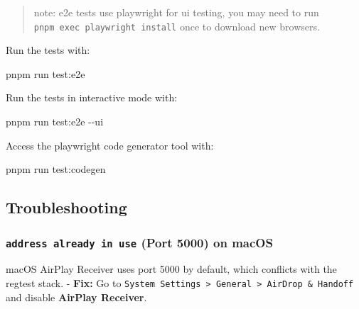 \documentclass[
]{article}
\newenvironment{Shaded}{}{}
\newcommand{\AttributeTok}[1]{\textcolor[rgb]{0.49,0.56,0.16}{#1}}
\newcommand{\ExtensionTok}[1]{#1}
\newcommand{\NormalTok}[1]{#1}
\begin{document}
\begin{quote}
note: e2e tests use playwright for ui testing, you may need to run
\texttt{pnpm\ exec\ playwright\ install} once to download new browsers.
\end{quote}

Run the tests with:

\begin{Shaded}
\begin{Highlighting}[]
\ExtensionTok{pnpm}\NormalTok{ run test:e2e}
\end{Highlighting}
\end{Shaded}

Run the tests in interactive mode with:

\begin{Shaded}
\begin{Highlighting}[]
\ExtensionTok{pnpm}\NormalTok{ run test:e2e }\AttributeTok{{-}{-}ui}
\end{Highlighting}
\end{Shaded}

Access the playwright code generator tool with:

\begin{Shaded}
\begin{Highlighting}[]
\ExtensionTok{pnpm}\NormalTok{ run test:codegen}
\end{Highlighting}
\end{Shaded}

\hypertarget{troubleshooting}{%
\subsection{Troubleshooting}\label{troubleshooting}}

\hypertarget{address-already-in-use-port-5000-on-macos}{%
\subsubsection{\texorpdfstring{\texttt{address\ already\ in\ use} (Port
5000) on
macOS}{address already in use (Port 5000) on macOS}}\label{address-already-in-use-port-5000-on-macos}}

macOS AirPlay Receiver uses port 5000 by default, which conflicts with
the regtest stack. - \textbf{Fix:} Go to
\texttt{System\ Settings\ \textgreater{}\ General\ \textgreater{}\ AirDrop\ \&\ Handoff}
and disable \textbf{AirPlay Receiver}.
\end{document}
